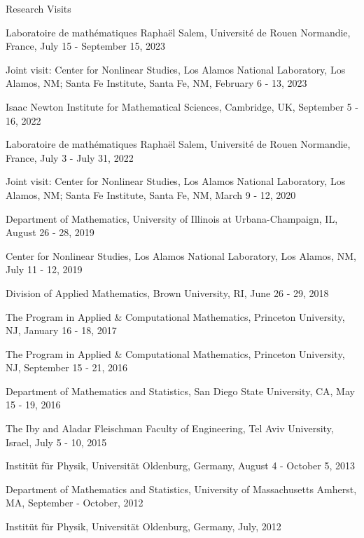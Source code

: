 \documentclass[10pt]{article} %
\newenvironment{innerlist}[1][\enskip\textbullet]%
        {\begin{compactitem}[#1]}{\end{compactitem}}
\begin{document}
\begin{section}{Research Visits} 
\begin{innerlist}
\setlength\itemsep{1em}
\item \vskip -4.3mm 
Laboratoire de math\'ematiques Rapha\"el Salem, Universit\'e de Rouen Normandie, France, July 15 - September 15, 2023
\item Joint visit: Center for Nonlinear Studies, Los Alamos National Laboratory, Los Alamos, NM;
Santa Fe Institute, Santa Fe, NM, February 6 - 13, 2023
\item Isaac Newton Institute for Mathematical Sciences, Cambridge, UK, September 5 - 16, 2022
\item Laboratoire de math\'ematiques Rapha\"el Salem, Universit\'e de Rouen Normandie, France, July 3 - July 31, 2022
\item Joint visit: Center for Nonlinear Studies, Los Alamos National Laboratory, Los Alamos, NM; 
Santa Fe Institute, Santa Fe, NM, March 9 - 12, 2020
\item Department of Mathematics, University of Illinois at Urbana-Champaign, IL, August 26 - 28, 2019
\item Center for Nonlinear Studies, Los Alamos National Laboratory, Los Alamos, NM, July 11 - 12, 2019 
\item Division of Applied Mathematics, Brown University, RI, June 26 - 29, 2018
\item The Program in Applied \& Computational Mathematics, Princeton University, NJ, January 16 - 18, 2017 
\item The Program in Applied \& Computational Mathematics, Princeton University, NJ, September 15 - 21, 2016 
\item Department of Mathematics and Statistics, San Diego State University, CA, May 15 - 19, 2016
\item The Iby and Aladar Fleischman Faculty of Engineering, Tel Aviv University, Israel, July 5 - 10, 2015
\item Instit\"ut f\"ur Physik, Universit\"at Oldenburg, Germany, August 4 - October 5, 2013
\item Department of Mathematics and Statistics, University of Massachusetts Amherst, MA, September - October, 2012
\item Instit\"ut f\"ur Physik, Universit\"at Oldenburg, Germany, July, 2012
\end{innerlist} 

\end{section}
\end{document}
